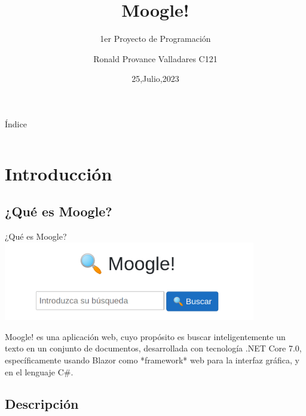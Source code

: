 \documentclass[19pt]{beamer}
\title{Moogle!}
\subtitle{1er Proyecto de Programación}
\author{Ronald Provance Valladares C121}
\institute[MATCOM]{Facultad de Matemática y Computación\\Universidad de la Habana}
\date{25,Julio,2023}
\begin{document}
		\maketitle

	\begin{frame}{Índice}
		\begin{columns}
			\begin{column}{.5\textwidth}
		        \tableofcontents[sections={1-2}] 
	        \end{column}
	        \begin{column}{.5\textwidth}
	           	\tableofcontents[sections={3}]
	         \end{column}
	    \end{columns}
	\end{frame}
		
\section{Introducción}


   \subsection{¿Qué es Moogle?}

      \begin{frame}{¿Qué es Moogle?}
     	\includegraphics[width=11cm]{moogle.png}
         \begin{center}
	    	Moogle! es una aplicación web, cuyo propósito es buscar inteligentemente un texto en un conjunto de documentos,
	    	desarrollada con tecnología .NET Core 7.0, específicamente usando Blazor como *framework* web para la interfaz gráfica, y en el lenguaje C\#.
    	\end{center}
      \end{frame}

    \subsection{Descripción}
\end{document}
